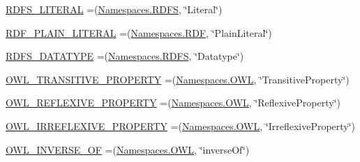 \begin{DoxyCompactItemize}
\item 
\hyperlink{enumorg_1_1semanticweb_1_1owlapi_1_1vocab_1_1_o_w_l_r_d_f_vocabulary_a760815964ff1d0013e6283c635ae7b54}{R\-D\-F\-S\-\_\-\-L\-I\-T\-E\-R\-A\-L} =(\hyperlink{enumorg_1_1semanticweb_1_1owlapi_1_1vocab_1_1_namespaces_a64d32d1177b8a61cc6da656defd88a5a}{Namespaces.\-R\-D\-F\-S}, \char`\"{}Literal\char`\"{})
\item 
\hyperlink{enumorg_1_1semanticweb_1_1owlapi_1_1vocab_1_1_o_w_l_r_d_f_vocabulary_a01c2f8d91e14f1b3ce7b2470bf641f50}{R\-D\-F\-\_\-\-P\-L\-A\-I\-N\-\_\-\-L\-I\-T\-E\-R\-A\-L} =(\hyperlink{enumorg_1_1semanticweb_1_1owlapi_1_1vocab_1_1_namespaces_a0d1c7991e82e2b5c495bb87f1123ce30}{Namespaces.\-R\-D\-F}, \char`\"{}Plain\-Literal\char`\"{})
\item 
\hyperlink{enumorg_1_1semanticweb_1_1owlapi_1_1vocab_1_1_o_w_l_r_d_f_vocabulary_a3bc7829dddcb690373d90c1476df3e98}{R\-D\-F\-S\-\_\-\-D\-A\-T\-A\-T\-Y\-P\-E} =(\hyperlink{enumorg_1_1semanticweb_1_1owlapi_1_1vocab_1_1_namespaces_a64d32d1177b8a61cc6da656defd88a5a}{Namespaces.\-R\-D\-F\-S}, \char`\"{}Datatype\char`\"{})
\item 
\hyperlink{enumorg_1_1semanticweb_1_1owlapi_1_1vocab_1_1_o_w_l_r_d_f_vocabulary_aaafbfed01f9993c59fee7d32403ccb2b}{O\-W\-L\-\_\-\-T\-R\-A\-N\-S\-I\-T\-I\-V\-E\-\_\-\-P\-R\-O\-P\-E\-R\-T\-Y} =(\hyperlink{enumorg_1_1semanticweb_1_1owlapi_1_1vocab_1_1_namespaces_a2fcb537074d9307ef1356ffb6a5bd6f4}{Namespaces.\-O\-W\-L}, \char`\"{}Transitive\-Property\char`\"{})
\item 
\hyperlink{enumorg_1_1semanticweb_1_1owlapi_1_1vocab_1_1_o_w_l_r_d_f_vocabulary_a5d08ae662d5ec92a01cb0deb4318d527}{O\-W\-L\-\_\-\-R\-E\-F\-L\-E\-X\-I\-V\-E\-\_\-\-P\-R\-O\-P\-E\-R\-T\-Y} =(\hyperlink{enumorg_1_1semanticweb_1_1owlapi_1_1vocab_1_1_namespaces_a2fcb537074d9307ef1356ffb6a5bd6f4}{Namespaces.\-O\-W\-L}, \char`\"{}Reflexive\-Property\char`\"{})
\item 
\hyperlink{enumorg_1_1semanticweb_1_1owlapi_1_1vocab_1_1_o_w_l_r_d_f_vocabulary_ae49f4011fd7ac569f9da0a7843de7619}{O\-W\-L\-\_\-\-I\-R\-R\-E\-F\-L\-E\-X\-I\-V\-E\-\_\-\-P\-R\-O\-P\-E\-R\-T\-Y} =(\hyperlink{enumorg_1_1semanticweb_1_1owlapi_1_1vocab_1_1_namespaces_a2fcb537074d9307ef1356ffb6a5bd6f4}{Namespaces.\-O\-W\-L}, \char`\"{}Irreflexive\-Property\char`\"{})
\item 
\hyperlink{enumorg_1_1semanticweb_1_1owlapi_1_1vocab_1_1_o_w_l_r_d_f_vocabulary_ae0754d694ca7d79857d068faf1dc6bb6}{O\-W\-L\-\_\-\-I\-N\-V\-E\-R\-S\-E\-\_\-\-O\-F} =(\hyperlink{enumorg_1_1semanticweb_1_1owlapi_1_1vocab_1_1_namespaces_a2fcb537074d9307ef1356ffb6a5bd6f4}{Namespaces.\-O\-W\-L}, \char`\"{}inverse\-Of\char`\"{})

\end{DoxyCompactItemize}
